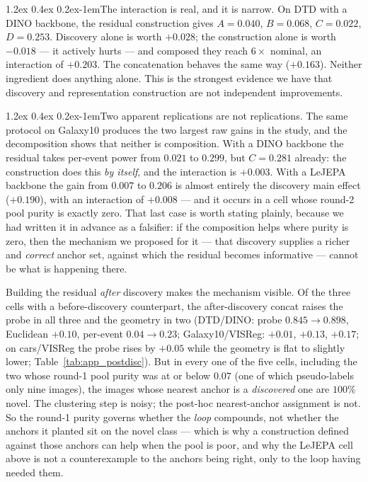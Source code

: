 \documentclass{article}
\makeatletter
\renewcommand\paragraph{\@startsection{paragraph}{4}{\z@}%
  {1.2ex \@plus 0.4ex \@minus 0.2ex}{-1em}{\normalsize\bf}}
\makeatother
\begin{document}
\paragraph{The interaction is real, and it is narrow.}
On DTD with a DINO backbone, the residual construction gives
$A = 0.040$, $B = 0.068$, $C = 0.022$, $D = 0.253$. Discovery alone is worth
$+0.028$; the construction alone is worth $-0.018$ --- it actively hurts ---
and composed they reach $6\times$ nominal, an interaction of $+0.203$. The
concatenation behaves the same way ($+0.163$). Neither ingredient does
anything alone. This is the strongest evidence we have that discovery and
representation construction are not independent improvements.

\paragraph{Two apparent replications are not replications.}
The same protocol on Galaxy10 produces the two largest raw gains in the
study, and the decomposition shows that neither is composition. With a DINO
backbone the residual takes per-event power from $0.021$ to $0.299$, but
$C = 0.281$ already: the construction does this \emph{by itself}, and the
interaction is $+0.003$. With a LeJEPA backbone the gain from $0.007$ to
$0.206$ is almost entirely the discovery main effect ($+0.190$), with an
interaction of $+0.008$ --- and it occurs in a cell whose round-2 pool purity
is exactly zero. That last case is worth stating plainly, because we had
written it in advance as a falsifier: if the composition helps where purity is
zero, then the mechanism we proposed for it --- that discovery supplies a
richer and \emph{correct} anchor set, against which the residual becomes
informative --- cannot be what is happening there.

Building the residual \emph{after} discovery makes the mechanism visible.
Of the three cells with a before-discovery counterpart, the after-discovery
concat raises the probe in all three and the geometry in two (DTD/DINO: probe
$0.845 \to 0.898$, Euclidean $+0.10$, per-event $0.04 \to 0.23$;
Galaxy10/VISReg: $+0.01$, $+0.13$, $+0.17$; on cars/VISReg the probe rises
by $+0.05$ while the geometry is flat to slightly lower;
Table~\ref{tab:app_postdisc}). But in every one of the five cells, including
the two whose round-1 pool purity was at or below $0.07$ (one of which
pseudo-labels only nine images), the images whose nearest anchor is a
\emph{discovered} one are $100\%$ novel. The
clustering step is noisy; the post-hoc nearest-anchor assignment is not. So
the round-1 purity governs whether the \emph{loop} compounds, not whether the
anchors it planted sit on the novel class --- which is why a construction
defined against those anchors can help when the pool is poor, and why the LeJEPA
cell above is not a counterexample to the anchors being right, only to the
loop having needed them.
\end{document}
